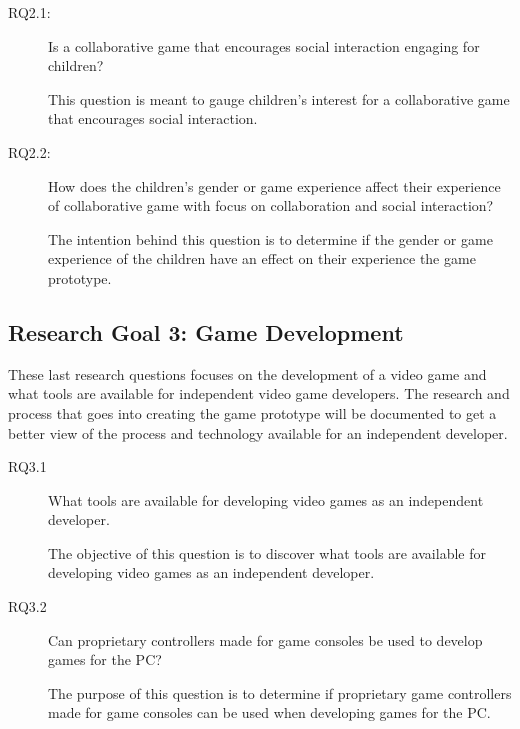 \begin{description}
	\item[RQ2.1:] Is a collaborative game that encourages social interaction engaging for children?
	
	This question is meant to gauge children's interest for a collaborative game that encourages social interaction.
	
	\item[RQ2.2:] How does the children's gender or game experience affect their experience of collaborative game with focus on collaboration and social interaction?
	
	The intention behind this question is to determine if  the gender or game experience of the children have an effect on their experience the game prototype.
\end{description}

\subsection{Research Goal 3: Game Development}
These last research questions focuses on the development of a video game and what tools are available for independent video game developers. The research and process that goes into creating the game prototype will be documented to get a better view of the process and technology available for an independent developer.
\begin{description}
	\item[RQ3.1] What tools are available for developing video games as an independent developer.
	
	The objective of this question is to discover what tools are available for developing video games as an independent developer. 
	
	\item[RQ3.2] Can proprietary controllers made for game consoles be used to develop games for the PC?
	
	The purpose of this question is to determine if proprietary game controllers made for game consoles can be used when developing games for the PC.
\end{description}
	


